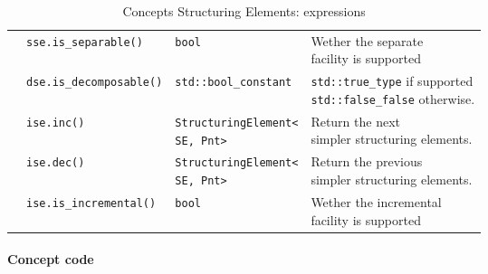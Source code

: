 \begin{table}[H]
\begin{scriptsize}
\begin{tabular}{llll}
      \multicolumn{1}{c|}{}                                     & \texttt{sse.is\_separable()}                          & \texttt{bool}                             & \makecell[l]{Wether the separate        \\ facility is supported}\\
      \cline{1-4}
      \multicolumn{1}{c|}{\multirow{4}{*}{\makecell[l]{Incremental                                                                                                                                            \\StructuringElement}}} & \texttt{dse.is\_decomposable()} & \texttt{std::bool\_constant} & \makecell[l]{\texttt{std::true\_type} if supported\\ \texttt{std::false\_false} otherwise.}\\
      \multicolumn{1}{c|}{}                                     & \texttt{ise.inc()}                                    & \makecell[l]{\texttt{StructuringElement<}                                           \\\texttt{SE, Pnt>}} & \makecell[l]{Return the next            \\ simpler structuring elements.}\\
      \multicolumn{1}{c|}{}                                     & \texttt{ise.dec()}                                    & \makecell[l]{\texttt{StructuringElement<}                                           \\\texttt{SE, Pnt>}} & \makecell[l]{Return the previous        \\ simpler structuring elements.}\\
      \multicolumn{1}{c|}{}                                     & \texttt{ise.is\_incremental()}                        & \texttt{bool}                             & \makecell[l]{Wether the incremental     \\ facility is supported}\\
      \cline{1-4}
    \end{tabular}
    \smallskip

    \caption{Concepts Structuring Elements: expressions}
  \end{scriptsize}
  \label{table:concept.se.expressions}
\end{table}

\paragraph{Concept code}


